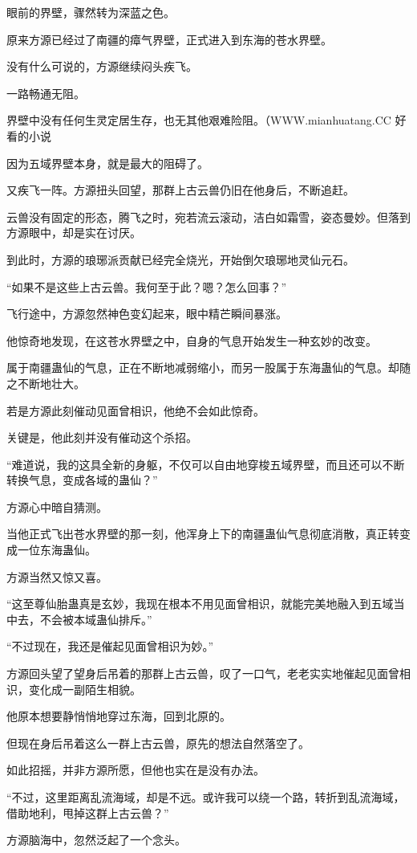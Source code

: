 \begin{this_body}
眼前的界壁，骤然转为深蓝之色。

原来方源已经过了南疆的瘴气界壁，正式进入到东海的苍水界壁。

没有什么可说的，方源继续闷头疾飞。

一路畅通无阻。

界壁中没有任何生灵定居生存，也无其他艰难险阻。（WWW.mianhuatang.CC 好看的小说

因为五域界壁本身，就是最大的阻碍了。

又疾飞一阵。方源扭头回望，那群上古云兽仍旧在他身后，不断追赶。

云兽没有固定的形态，腾飞之时，宛若流云滚动，洁白如霜雪，姿态曼妙。但落到方源眼中，却是实在讨厌。

到此时，方源的琅琊派贡献已经完全烧光，开始倒欠琅琊地灵仙元石。

“如果不是这些上古云兽。我何至于此？嗯？怎么回事？”

飞行途中，方源忽然神色变幻起来，眼中精芒瞬间暴涨。

他惊奇地发现，在这苍水界壁之中，自身的气息开始发生一种玄妙的改变。

属于南疆蛊仙的气息，正在不断地减弱缩小，而另一股属于东海蛊仙的气息。却随之不断地壮大。

若是方源此刻催动见面曾相识，他绝不会如此惊奇。

关键是，他此刻并没有催动这个杀招。

“难道说，我的这具全新的身躯，不仅可以自由地穿梭五域界壁，而且还可以不断转换气息，变成各域的蛊仙？”

方源心中暗自猜测。

当他正式飞出苍水界壁的那一刻，他浑身上下的南疆蛊仙气息彻底消散，真正转变成一位东海蛊仙。

方源当然又惊又喜。

“这至尊仙胎蛊真是玄妙，我现在根本不用见面曾相识，就能完美地融入到五域当中去，不会被本域蛊仙排斥。”

“不过现在，我还是催起见面曾相识为妙。”

方源回头望了望身后吊着的那群上古云兽，叹了一口气，老老实实地催起见面曾相识，变化成一副陌生相貌。

他原本想要静悄悄地穿过东海，回到北原的。

但现在身后吊着这么一群上古云兽，原先的想法自然落空了。

如此招摇，并非方源所愿，但他也实在是没有办法。

“不过，这里距离乱流海域，却是不远。或许我可以绕一个路，转折到乱流海域，借助地利，甩掉这群上古云兽？”

方源脑海中，忽然泛起了一个念头。


\end{this_body}
